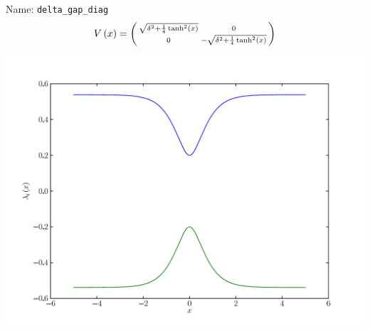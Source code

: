\documentclass[a4paper,10pt]{report}
\begin{document}
\begin{minipage}{0.5\linewidth}
  Name:    \texttt{delta\_gap\_diag}
  \begin{equation*}
    V\left( x \right) = \left(\begin{smallmatrix}\sqrt{\delta^{2} + \frac{1}{4} \operatorname{tanh}^{2}\left(x\right)} & 0\\0 & - \sqrt{\delta^{2} + \frac{1}{4} \operatorname{tanh}^{2}\left(x\right)}\end{smallmatrix}\right)
  \end{equation*}
\end{minipage}
\begin{minipage}{0.5\linewidth}
  \begin{center}
    \includegraphics[scale=0.25]{./fig/delta_gap_diag.pdf}
  \end{center}
\end{minipage}
\end{document}

